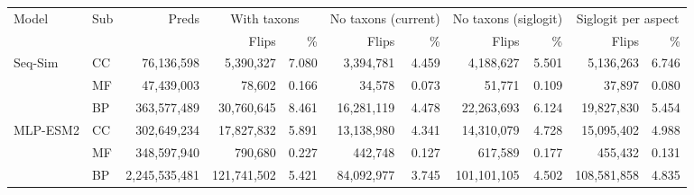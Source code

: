 \begin{tabular}{llrrrrrrrrr}
\toprule
Model & Sub & Preds & \multicolumn{2}{c}{With taxons} & \multicolumn{2}{c}{No taxons (current)} & \multicolumn{2}{c}{No taxons (siglogit)} & \multicolumn{2}{c}{Siglogit per aspect} \\
\cmidrule(lr){4-5}\cmidrule(lr){6-7}\cmidrule(lr){8-9}\cmidrule(lr){10-11}
& & & Flips & \% & Flips & \% & Flips & \% & Flips & \% \\
\midrule
Seq-Sim & CC & 76{,}136{,}598 & 5{,}390{,}327 & 7.080 & 3{,}394{,}781 & 4.459 & 4{,}188{,}627 & 5.501 & 5{,}136{,}263 & 6.746 \\
 & MF & 47{,}439{,}003 & 78{,}602 & 0.166 & 34{,}578 & 0.073 & 51{,}771 & 0.109 & 37{,}897 & 0.080 \\
 & BP & 363{,}577{,}489 & 30{,}760{,}645 & 8.461 & 16{,}281{,}119 & 4.478 & 22{,}263{,}693 & 6.124 & 19{,}827{,}830 & 5.454 \\
\midrule
MLP-ESM2 & CC & 302{,}649{,}234 & 17{,}827{,}832 & 5.891 & 13{,}138{,}980 & 4.341 & 14{,}310{,}079 & 4.728 & 15{,}095{,}402 & 4.988 \\
 & MF & 348{,}597{,}940 & 790{,}680 & 0.227 & 442{,}748 & 0.127 & 617{,}589 & 0.177 & 455{,}432 & 0.131 \\
 & BP & 2{,}245{,}535{,}481 & 121{,}741{,}502 & 5.421 & 84{,}092{,}977 & 3.745 & 101{,}101{,}105 & 4.502 & 108{,}581{,}858 & 4.835 \\
\bottomrule
\end{tabular}
